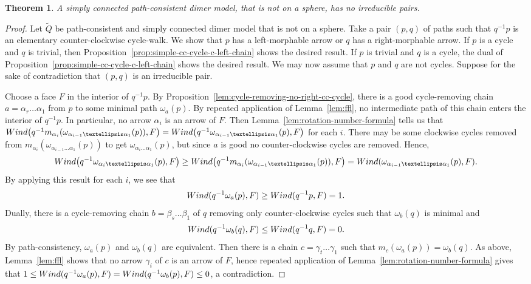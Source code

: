 \documentclass{article}
\newtheorem{thm}{Theorem}[section]
\theoremstyle{definition}
\newcommand{\wind}{\textup{Wind}}
\begin{document}
\begin{thm}\label{prop:no-irreducible-pairs}
	A simply connected path-consistent dimer model, that is not on a sphere, has no irreducible pairs. 
\end{thm}
\begin{proof}
	Let $\widetilde Q$ be path-consistent and simply connected dimer model that is not on a sphere. 
	Take a pair $(p,q)$ of paths such that $q^{-1}p$ is an elementary counter-clockwise cycle-walk. We show that $p$ has a left-morphable arrow or $q$ has a right-morphable arrow.
	If $p$ is a cycle and $q$ is trivial, then Proposition~\ref{prop:simple-cc-cycle-c-left-chain} shows the desired result. If $p$ is trivial and $q$ is a cycle, the dual of Proposition~\ref{prop:simple-cc-cycle-c-left-chain} shows the desired result. We may now assume that $p$ and $q$ are not cycles. Suppose for the sake of contradiction that $(p,q)$ is an irreducible pair.
	
	Choose a face $F$ in the interior of $q^{-1}p$. By Proposition~\ref{lem:cycle-removing-no-right-cc-cycle}, there is a good cycle-removing chain $a=\alpha_r\dots\alpha_1$ from $p$ to some minimal path $\omega_a(p)$. By repeated application of Lemma~\ref{lem:ffl}, no intermediate path of this chain enters the interior of $q^{-1}p$. In particular, no arrow $\alpha_i$ is an arrow of $F$.
	Then Lemma~\ref{lem:rotation-number-formula} tells us that $\wind\big(q^{-1}m_{\alpha_i}(\omega_{\alpha_{i-1}\dots\alpha_{1}}(p)),F\big)=\wind\big(q^{-1}\omega_{\alpha_{i-1}\dots\alpha_{1}}(p),F\big)$ for each $i$.
	There may be some clockwise cycles removed from $m_{\alpha_i}(\omega_{\alpha_{i-1}\dots\alpha_{1}}(p))$ to get $\omega_{\alpha_i\dots\alpha_1}(p)$, but since $a$ is good no counter-clockwise cycles are removed. Hence,
	\[\wind\big(q^{-1}\omega_{\alpha_i\dots\alpha_1}(p),F\big)\geq\wind\big(q^{-1}m_{\alpha_i}(\omega_{\alpha_{i-1}\dots\alpha_1}(p)),F\big)=\wind(\omega_{\alpha_{i-1}\dots\alpha_1}(p),F).\]
	By applying this result for each $i$, we see that
	\[\wind(q^{-1}\omega_a(p),F)\geq\wind(q^{-1}p,F)=1.\]
	Dually, there is a cycle-removing chain $b=\beta_s\dots\beta_1$ of $q$ removing only counter-clockwise cycles such that $\omega_b(q)$ is minimal and
	\[\wind(q^{-1}\omega_b(q),F)\leq\wind(q^{-1}q,F)=0.\]
	By path-consistency, $\omega_a(p)$ and $\omega_b(q)$ are equivalent. Then there is a chain $c=\gamma_t\dots\gamma_1$ such that $m_c(\omega_a(p))=\omega_b(q)$. As above, Lemma~\ref{lem:ffl} shows that no arrow $\gamma_i$ of $c$ is an arrow of $F$, hence repeated application of Lemma~\ref{lem:rotation-number-formula} gives that $1\leq \wind(q^{-1}\omega_a(p),F)=\wind(q^{-1}\omega_b(p),F)\leq 0$, a contradiction.
\end{proof}
\end{document}
